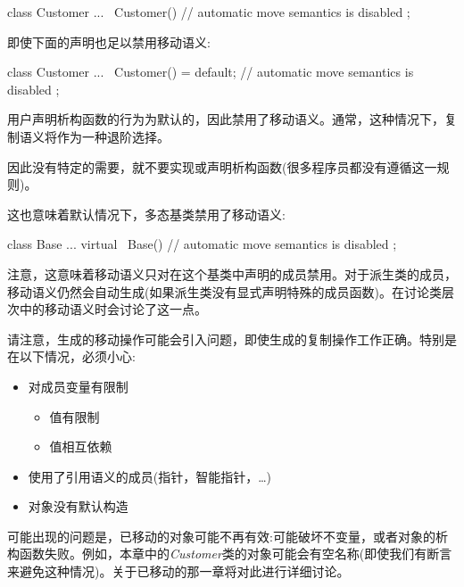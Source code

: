 \begin{codebox}[cpp]
class Customer {
  ...
  ~Customer() { // automatic move semantics is disabled
  }
};
\end{codebox}

即使下面的声明也足以禁用移动语义:\par

\begin{codebox}[cpp]
class Customer {
  ...
  ~Customer() = default; // automatic move semantics is disabled
};
\end{codebox}

用户声明析构函数的行为为默认的，因此禁用了移动语义。通常，这种情况下，复制语义将作为一种退阶选择。\par

因此没有特定的需要，就不要实现或声明析构函数(很多程序员都没有遵循这一规则)。\par

这也意味着默认情况下，多态基类禁用了移动语义:\par

\begin{codebox}[cpp]
class Base {
  ...
  virtual ~Base() { // automatic move semantics is disabled
  }
};
\end{codebox}

注意，这意味着移动语义只对在这个基类中声明的成员禁用。对于派生类的成员，移动语义仍然会自动生成(如果派生类没有显式声明特殊的成员函数)。在讨论类层次中的移动语义时会讨论了这一点。\par


请注意，生成的移动操作可能会引入问题，即使生成的复制操作工作正确。特别是在以下情况，必须小心:\par

\begin{itemize}
  \item 对成员变量有限制
  \begin{itemize}
    \item[-] 值有限制
    \item[-] 值相互依赖
  \end{itemize}
  \item 使用了引用语义的成员(指针，智能指针，…)
  \item 对象没有默认构造
\end{itemize}

可能出现的问题是，已移动的对象可能不再有效:可能破坏不变量，或者对象的析构函数失败。例如，本章中的\textit{Customer}类的对象可能会有空名称(即使我们有断言来避免这种情况)。关于已移动的那一章将对此进行详细讨论。\par


